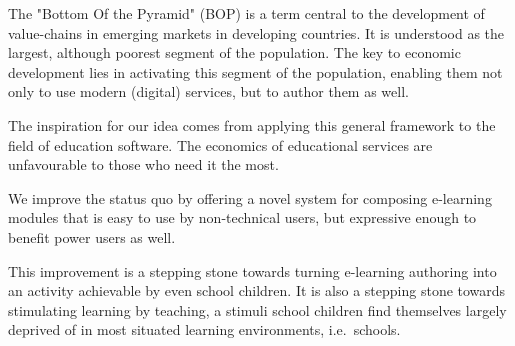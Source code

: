 The "Bottom Of the Pyramid" (BOP) is a term central to the development of
value-chains in emerging markets in developing countries. It is understood as
the largest, although poorest segment of the population. The key to economic 
development lies in activating this segment of the population, enabling them 
not only to use modern (digital) services, but to author them as 
well\cite{prahalad2009fortune}.

The inspiration for our idea comes from applying this general framework to the
field of education software. The economics of educational services are 
unfavourable to those who need it the most.

We improve the status quo by offering a novel system for composing e-learning 
modules that is easy to use by non-technical users, but expressive enough to 
benefit power users as well.

This improvement is a stepping stone towards turning e-learning authoring into 
an activity achievable by even school children. It is also a stepping stone 
towards stimulating learning by teaching, a stimuli school children find 
themselves largely deprived of in most situated learning environments, i.e.\ 
schools.
